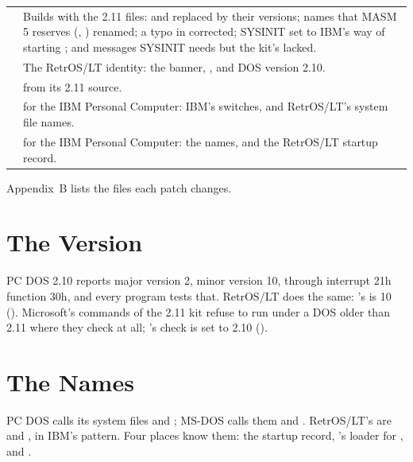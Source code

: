 \begin{tabularx}{\textwidth}{@{}P{0.5in}Y@{}}
\toprule
{} & Builds with the 2.11 files:  and 
replaced by their  versions; names that MASM 5 reserves
(, ) renamed; a typo in 
corrected; SYSINIT set to IBM's way of starting ; and
messages SYSINIT needs but the kit's  lacked.\\
 & The RetrOS/LT identity: the banner, , and DOS
version 2.10.\\
 &  from its 2.11 source.\\
 &  for the IBM Personal Computer: IBM's switches,
and RetrOS/LT's system file names.\\
 &  for the IBM Personal Computer: the names, and
the RetrOS/LT startup record.\\
\bottomrule
\end{tabularx}

Appendix~B lists the files each patch changes.

\section{The Version}

PC DOS 2.10 reports major version 2, minor version 10, through interrupt
21h function 30h, and every program tests that. RetrOS/LT does the same:
's  is 10 ().
Microsoft's commands of the 2.11 kit refuse to run under a DOS older than
2.11 where they check at all; 's check is set to 2.10 ().

\section{The Names}

PC DOS calls its system files  and ;
MS-DOS calls them  and . RetrOS/LT's are
 and , in IBM's pattern. Four places
know them: the startup record, 's loader for
,  and .
